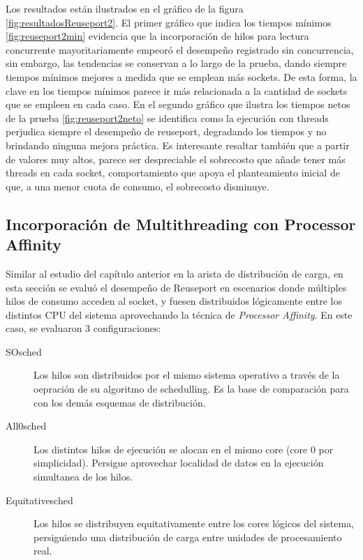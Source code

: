 Los resultados están ilustrados en el gráfico de la figura \ref{fig:resultadosReuseport2}. El primer gráfico que indica los tiempos mínimos \ref{fig:reuseport2min} evidencia que la incorporación de hilos para lectura concurrente mayoritariamente empeoró el desempeño registrado sin concurrencia, sin embargo, las tendencias se conservan a lo largo de la prueba, dando siempre tiempos mínimos mejores a medida que se emplean más sockets. De esta forma, la clave en los tiempos mínimos parece ir más relacionada a la cantidad de sockets que se empleen en cada caso. En el segundo gráfico que ilustra los tiempos netos de la prueba \ref{fig:reuseport2neto} se identifica como la ejecución con threads perjudica siempre el desempeño de reuseport, degradando los tiempos y no brindando ninguna mejora práctica. Es interesante resaltar también que a partir de valores muy altos, parece ser despreciable el sobrecosto que añade tener más threads en cada socket, comportamiento que apoya el planteamiento inicial de que, a una menor cuota de consumo, el sobrecosto disminuye.

\subsection{Incorporación de Multithreading con Processor Affinity}
Similar al estudio del capítulo anterior en la arista de distribución de carga, en esta sección se evaluó el desempeño de Reuseport en escenarios donde múltiples hilos de consumo acceden al socket, y fuesen distribuidos lógicamente entre los distintos CPU del sistema aprovechando la técnica de \emph{Processor Affinity}. En este caso, se evaluaron 3 configuraciones:

\begin{description}
\item[SOsched] Los hilos son distribuidos por el mismo sistema operativo a través de la oepración de su algoritmo de schedulling. Es la base de comparación para con los demás esquemas de distribución.
\item[All0sched] Los distintos hilos de ejecución se alocan en el mismo core (core 0 por simplicidad). Persigue aprovechar localidad de datos en la ejecución simultanea de los hilos.
\item[Equitativesched] Los hilos se distribuyen equitativamente entre los cores lógicos del sistema, persiguiendo una distribución de carga entre unidades de procesamiento real.
\end{description}

